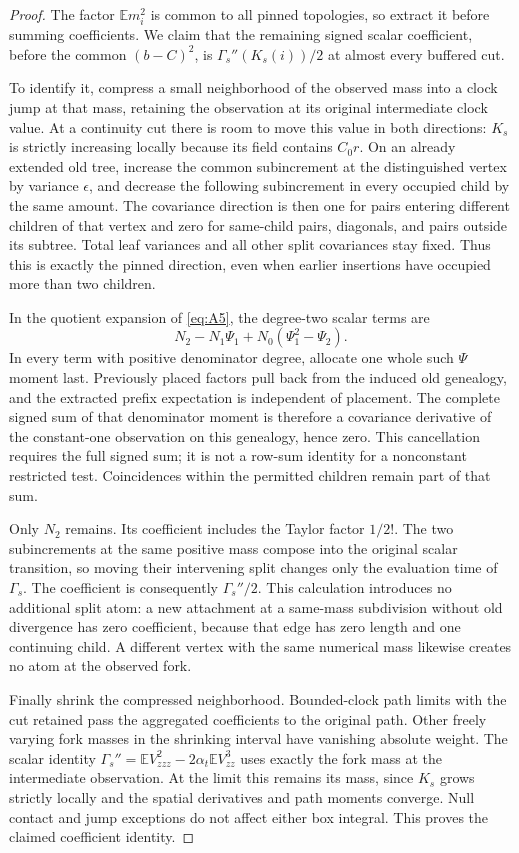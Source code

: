 \begin{proof}
The factor \(\mathbb E m_i^2\) is common to all pinned topologies,
so extract it before summing coefficients. We claim that the remaining
signed scalar coefficient, before the common \((b-C)^2\), is
\(\Gamma_s''(K_s(i))/2\) at almost every buffered cut.

To identify it, compress a small neighborhood of the observed mass
into a clock jump at that mass, retaining the observation at its
original intermediate clock value. At a continuity cut there is room
to move this value in both directions: \(K_s\) is strictly increasing
locally because its field contains \(C_0r\). On an already extended
old tree, increase the common subincrement at the distinguished vertex
by variance \(\epsilon\), and decrease the following subincrement
in every occupied child by the same amount. The covariance direction
is then one for pairs entering different children of that vertex and
zero for same-child pairs, diagonals, and pairs outside its subtree.
Total leaf variances and all other split covariances stay fixed.
Thus this is exactly the pinned direction, even when earlier
insertions have occupied more than two children.

In the quotient expansion of \eqref{eq:A5}, the degree-two scalar
terms are
\[
 N_2-N_1\Psi_1+N_0(\Psi_1^2-\Psi_2).
\]
In every term with positive denominator degree, allocate one whole
such \(\Psi\) moment last. Previously placed factors pull back from
the induced old genealogy, and the extracted prefix expectation is
independent of placement. The complete signed sum of that denominator
moment is therefore a covariance derivative of the constant-one
observation on this genealogy, hence zero. This cancellation requires
the full signed sum; it is not a row-sum identity for a nonconstant
restricted test. Coincidences within the permitted children remain
part of that sum.

Only \(N_2\) remains. Its coefficient includes the Taylor factor
\(1/2!\). The two subincrements at the same positive mass compose
into the original scalar transition, so moving their intervening split
changes only the evaluation time of \(\Gamma_s\). The coefficient
is consequently \(\Gamma_s''/2\). This calculation introduces no
additional split atom: a new attachment at a same-mass subdivision
without old divergence has zero coefficient, because that edge has
zero length and one continuing child. A different vertex with the
same numerical mass likewise creates no atom at the observed fork.

Finally shrink the compressed neighborhood. Bounded-clock path limits
with the cut retained pass the aggregated coefficients to the original
path. Other freely varying fork masses in the shrinking interval have
vanishing absolute weight. The scalar identity
\(\Gamma_s''=\mathbb EV_{zzz}^2-2\alpha_t\mathbb EV_{zz}^3\)
uses exactly the fork mass at the intermediate observation. At the
limit this remains its mass, since \(K_s\) grows strictly locally
and the spatial derivatives and path moments converge. Null contact
and jump exceptions do not affect either box integral. This proves
the claimed coefficient identity.


\end{proof}
